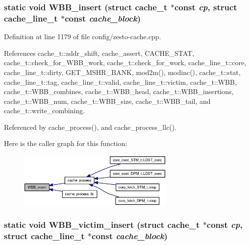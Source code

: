 \subsubsection[{WBB\_\-insert}]{\setlength{\rightskip}{0pt plus 5cm}static void WBB\_\-insert (struct {\bf cache\_\-t} $\ast$const  {\em cp}, \/  struct {\bf cache\_\-line\_\-t} $\ast$const  {\em cache\_\-block})\hspace{0.3cm}{\tt  [static]}}\label{config_2zesto-cache_8cpp_54a68443796a201ceb5456ce0fc69bc4}




Definition at line 1179 of file config/zesto-cache.cpp.

References cache\_\-t::addr\_\-shift, cache\_\-assert, CACHE\_\-STAT, cache\_\-t::check\_\-for\_\-WBB\_\-work, cache\_\-t::check\_\-for\_\-work, cache\_\-line\_\-t::core, cache\_\-line\_\-t::dirty, GET\_\-MSHR\_\-BANK, mod2m(), modinc(), cache\_\-t::stat, cache\_\-line\_\-t::tag, cache\_\-line\_\-t::valid, cache\_\-line\_\-t::victim, cache\_\-t::WBB, cache\_\-t::WBB\_\-combines, cache\_\-t::WBB\_\-head, cache\_\-t::WBB\_\-insertions, cache\_\-t::WBB\_\-num, cache\_\-t::WBB\_\-size, cache\_\-t::WBB\_\-tail, and cache\_\-t::write\_\-combining.

Referenced by cache\_\-process(), and cache\_\-process\_\-llc().

Here is the caller graph for this function:\nopagebreak
\begin{figure}[H]
\begin{center}
\leavevmode
\includegraphics[width=218pt]{config_2zesto-cache_8cpp_54a68443796a201ceb5456ce0fc69bc4_icgraph}
\end{center}
\end{figure}
\subsubsection[{WBB\_\-victim\_\-insert}]{\setlength{\rightskip}{0pt plus 5cm}static void WBB\_\-victim\_\-insert (struct {\bf cache\_\-t} $\ast$const  {\em cp}, \/  struct {\bf cache\_\-line\_\-t} $\ast$const  {\em cache\_\-block})\hspace{0.3cm}{\tt  [static]}}\label{config_2zesto-cache_8cpp_4a2ea45f307de25eaffcd48354e67a18}




